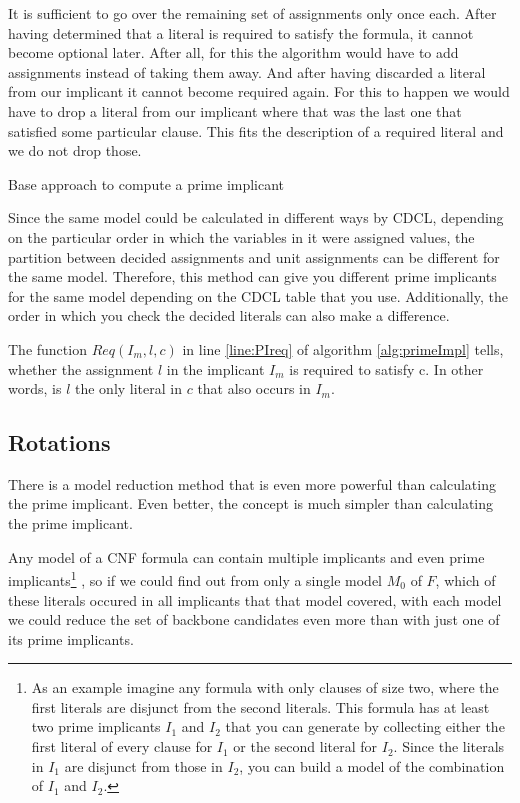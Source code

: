 It is sufficient to go over the remaining set of assignments only once each. After having determined that a literal is required to satisfy the formula, it cannot become optional later. After all, for this the algorithm would have to add assignments instead of taking them away. And after having discarded a literal from our implicant it cannot become required again. For this to happen we would have to drop a literal from our implicant where that was the last one that satisfied some particular clause. This fits the description of a required literal and we do not drop those.
\begin{algorithm}
\caption{{\sc Base approach to compute a prime implicant}}
\label{alg:primeImpl}
\DontPrintSemicolon
{}
\;
\end{algorithm}

Since the same model could be calculated in different ways by CDCL, depending on the particular order in which the variables in it were assigned values, the partition between decided assignments and unit assignments can be different for the same model. Therefore, this method can give you different prime implicants for the same model depending on the CDCL table that you use. Additionally, the order in which you check the decided literals can also make a difference. 

The function $Req(I_m,l,c)$ in line \ref{line:PIreq} of algorithm \ref{alg:primeImpl} tells, whether the assignment $l$ in the implicant $I_m$ is required to satisfy c. In other words, is $l$ the only literal in $c$ that also occurs in $I_m$.

\subsection{Rotations}
\label{ss:rot}
There is a model reduction method that is even more powerful than calculating the prime implicant. Even better, the concept is much simpler than calculating the prime implicant. 

Any model of a CNF formula can contain multiple implicants and even prime implicants\footnote
	{As an example imagine any formula with only clauses of size two, where the first literals are disjunct from the second literals. This formula has at least two prime implicants $I_1$ and $I_2$ that you can generate by collecting either the first literal of every clause for $I_1$ or the second literal for $I_2$. Since the literals in $I_1$ are disjunct from those in $I_2$, you can build a model of the combination of $I_1$ and $I_2$.}
, so if we could find out from only a single model $M_0$ of $F$, which of these literals occured in all implicants that that model covered, with each model we could reduce the set of backbone candidates even more than with just one of its prime implicants.

